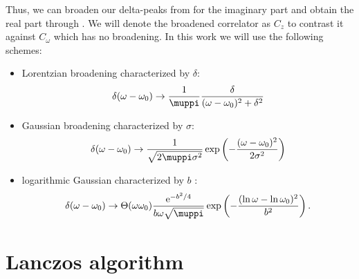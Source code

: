 Thus, we can broaden our delta-peaks from 
for the imaginary part and obtain the real part through .
We will denote the broadened correlator as $C_z$
to contrast it against $C_\omega$ which has no broadening.
In this work we will use the following schemes:
\begin{itemize}
    \item Lorentzian broadening characterized by $\delta$:
          \begin{equation}
              \delta(\omega - \omega_0)
              \to
              \frac{1}{\muppi}\frac{\delta}{(\omega - \omega_0)^2 + \delta^2}
          \end{equation}
    \item Gaussian broadening characterized by $\sigma$:
          \begin{equation}
              \delta(\omega - \omega_0)
              \to
              \frac{1}{\sqrt{2\muppi \sigma^2}}\exp\left(-\frac{(\omega - \omega_0)^2}{2\sigma^2}\right)
          \end{equation}
    \item logarithmic Gaussian characterized by $b$ \cite{Bulla2008}:
          \begin{equation}
              \delta(\omega - \omega_0)
              \to
              \Theta(\omega\omega_0)\frac{\me^{-b^2/4}}{b\omega\sqrt{\muppi}}\exp\left(-\frac{(\ln\omega-\ln\omega_0)^2}{b^2}\right).
          \end{equation}
\end{itemize}

\section{Lanczos algorithm}

